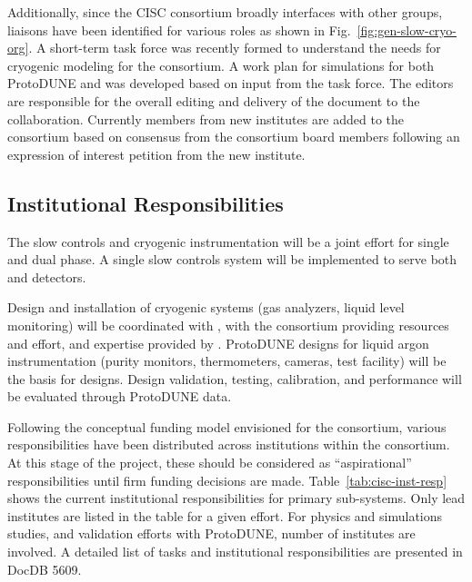 Additionally, since the CISC consortium broadly interfaces with other groups, liaisons have been identified for various roles as shown in Fig.~\ref{fig:gen-slow-cryo-org}. 
A short-term task force was recently formed to understand the needs for cryogenic modeling for the consortium. A work plan for  simulations for both ProtoDUNE and  was developed based on input from the task force. The  editors are responsible for the overall editing and delivery of the  document to the collaboration. Currently members from new institutes are added to the consortium based on consensus from the consortium board members following an expression of interest petition from the new institute.

\subsection{Institutional Responsibilities}

The slow controls and cryogenic instrumentation will be a joint effort for single and dual phase. A single slow controls system will be implemented to serve both  and  detectors.

Design and installation of cryogenic systems (gas analyzers, liquid level monitoring) will be coordinated with , with the consortium providing resources and effort, and expertise provided by . ProtoDUNE designs for liquid argon instrumentation (purity monitors, thermometers, cameras, test facility) will be the basis for  designs. Design validation, testing, calibration, and performance will be evaluated through ProtoDUNE data.

Following the conceptual funding model envisioned for the consortium, various responsibilities have been distributed across institutions within the consortium. At this stage of the project, these should be considered as ``aspirational'' responsibilities until firm funding decisions are made. Table~\ref{tab:cisc-inst-resp} shows the current institutional responsibilities for primary  sub-systems. Only lead institutes are listed in the table for a given effort. For physics and simulations studies, and validation efforts with ProtoDUNE, number of institutes are involved. A detailed list of tasks and institutional responsibilities are presented in  DocDB 5609.

